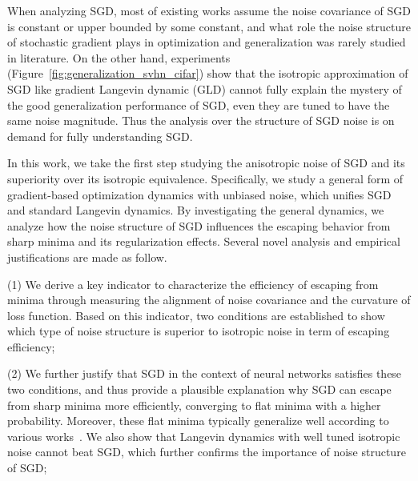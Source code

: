 \documentclass{article}
\begin{document}
When analyzing SGD, most of existing works  assume the noise covariance of SGD is constant or upper bounded by some constant, and what role the noise structure of stochastic gradient plays in optimization and generalization was rarely studied in literature. 
On the other hand, experiments (Figure~\ref{fig:generalization_svhn_cifar}) show that the isotropic approximation of SGD like gradient Langevin dynamic (GLD) cannot fully explain the mystery of the good generalization performance of SGD, even they are tuned to have the same noise magnitude.
Thus the analysis over the structure of SGD noise is on demand for fully understanding SGD.
 
In this work, we take the first step studying the anisotropic noise of SGD and its superiority over its isotropic equivalence.
Specifically, we  study a general form of gradient-based optimization dynamics with unbiased noise, which unifies SGD and standard Langevin dynamics.
By investigating the general dynamics, we analyze how the noise structure of SGD influences the escaping behavior from sharp minima and its regularization effects.
Several novel  analysis and empirical justifications are made as follow.

(1) We derive a key indicator to characterize the efficiency of escaping from minima through measuring the alignment of noise covariance and the curvature of loss function.
Based on this indicator, two conditions are established to show which type of noise structure is superior to isotropic noise in term of escaping efficiency;

(2) We further justify that SGD in the context of neural networks satisfies these two conditions, and thus provide a plausible explanation why SGD can escape from sharp minima more efficiently, converging to flat minima with a higher probability. Moreover, these flat minima typically generalize well according to various works~\citep{hochreiter1997flat,keskar2016large,neyshabur2017,wu2017towards}. We also show that Langevin dynamics with well tuned isotropic noise cannot beat SGD, which further confirms the importance of noise structure of SGD;
\end{document}

